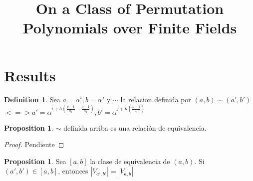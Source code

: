 \documentclass{article}
\theoremstyle{definition}
\newtheorem{definition}[theorem]{Definition}
\newtheorem{prop}[theorem]{Proposition}
\theoremstyle{remark}
\numberwithin{equation}{section}
\begin{document}
\title{On a Class of Permutation Polynomials over Finite Fields}


\maketitle

\begin{abstract}

\end{abstract}


\section{Results}

\begin{definition}

  Sea $a = \alpha^i, b = \alpha^j$ y $\sim$ la relacion definida por $(a,b) \sim (a', b')$ 
  $<=> a' = \alpha^{i+h(\frac{p-1}{d_1} - \frac{p-1}{d_2})}, b' = \alpha^{j+h(\frac{p-1}{d_1})}$

\end{definition}

\begin{prop}
  
  $\sim$ definida arriba es una relaci\'on de equivalencia.

\end{prop}

\begin{proof}
  
  Pendiente

\end{proof}

\begin{prop}
  
  Sea $[a, b]$ la clase de equivalencia de $(a, b)$. Si $(a', b') \in [a, b]$, entonces 
  $|V_{a', b'}| = |V_{a, b}|$

\end{prop}
\end{document}

